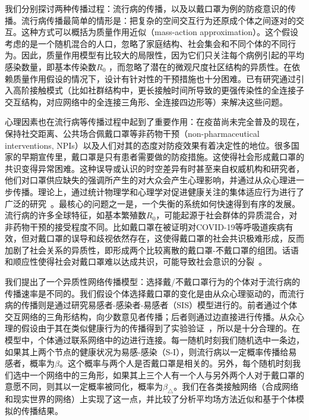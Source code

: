 我们分别探讨两种传播过程：流行病的传播，以及以戴口罩为例的防疫意识的传播。流行病传播最简单的情形是：把复杂的空间交互行为还原成个体之间逐对的交互。这种方式可以概括为质量作用近似（mass-action approximation）\cite{mollison1995epidemic}。这个假设考虑的是一个随机混合的人口，忽略了家庭结构、社会集会和不同个体的不同行为。因此，质量作用模型有比较大的局限性，因为它们只关注每个病例引起的平均感染数量，即基本传染数$R_0$ ，而忽略了潜在的微观尺度社区结构的异质性\cite{hebert2020beyond}。在依赖质量作用假设的情况下，设计有针对性的干预措施也十分困难。已有研究通过引入高阶接触模式（比如社群结构中，更长接触时间所导致的更强传染性的全连接子交互结构，对应网络中的全连接三角形、全连接四边形等）来解决这些问题\cite{iacopini2019simplicial}。

心理因素也在流行病等传播过程中起到了重要作用：在疫苗尚未完全普及的现在，保持社交距离、公共场合佩戴口罩等非药物干预（non-pharmaceutical interventions, NPIs）以及人们对其的态度对防疫效果有着决定性的地位。很多国家的早期宣传里，戴口罩是只有患者需要做的防疫措施。这使得社会形成戴口罩的共识变得异常困难\cite{lai2020effect, van2020face, Adolph2020PandemicPT, hellewell2020feasibility, Wolf2020AwarenessAA, Cheng2020TheRO, eikenberry2020to, erku2020fear, enberg2020covid}。这种误导或认识的时空差异有时甚至来自权威机构和研究者，他们对口罩供应缺失的强调所产生的对大众会产生心理影响\cite{biancovilli2020governments,landi2020should,sugaya2020real,weill2020social}，并通过从众心理进一步传播。理论上，通过统计物理学和心理学对促进健康关注的集体适应行为进行了广泛的研究~\cite{castellano2009statistical, centola2007complex, centola2010spread, centola2011experimental, christakis2007spread}。最核心的问题之一是，一个失衡的系统如何快速得到有序的发展。流行病的许多全球特征，如基本繁殖数$R_0$，可能起源于社会群体的异质混合，对非药物干预的接受程度不同。比如戴口罩在被证明对COVID-19等呼吸道疾病有效，但对戴口罩的误导和歧视依然存在，这使得戴口罩的社会共识极难形成，反而加剧了社会关系的异质性，即形成两个比较离散的戴口罩-不戴口罩的组团。话语和顺应性使得社会对戴口罩难以达成共识，可能导致社会意识的分裂~\cite{holme2006nonequilibrium}。

我们提出了一个异质性网络传播模型：选择戴/不戴口罩行为的个体对于流行病的传播速率是不同的。我们假设个体选择戴口罩的变化是由从众心理驱动的，而流行病的传播则是通过研究易感者-感染者-易感者（SIS）模型进行的。前者通过个体交互网络的三角形结构，向少数意见者传播；后者则通过边直接进行传播。从众心理的假设由于其在类似健康行为的传播得到了实验验证~\cite{christakis2008collective, zhang2016support}，所以是十分合理的。在模型中，个体通过联系网络中的边进行连接。每一随机时刻我们随机选中一条边，如果其上两个节点的健康状况为易感-感染（S-I），则流行病以一定概率传播给易感者，概率为$\beta$。这个概率与两个人是否戴口罩是相关的。另外，每个随机时刻我们选中一个网络中的三角形，如果其上三个人有一个人与另外两个人对于戴口罩的意愿不同，则其以一定概率被同化，概率为$\beta_\triangle$。我们在各类接触网络（合成网络和现实世界的网络）上实现了这一点，并比较了分析平均场方法近似和基于个体模拟的传播结果。


